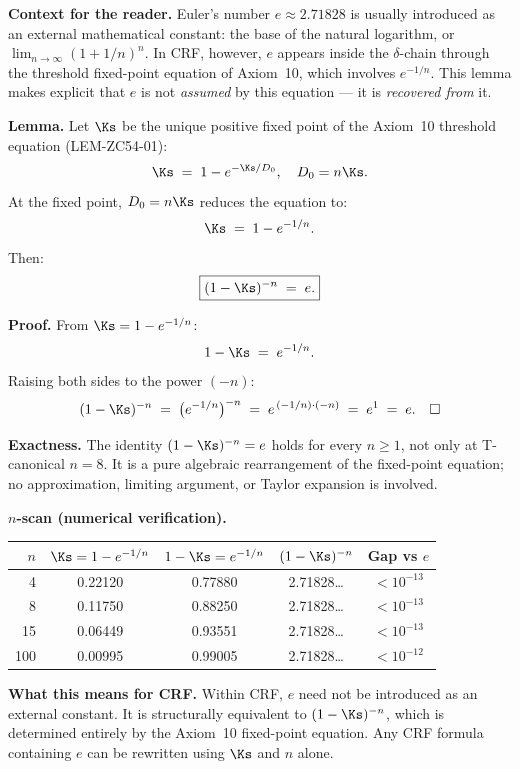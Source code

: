 \documentclass[12pt, a4paper]{article}
\begin{document}
\begin{formalbox}[title={LEM-ZC62-01: $e = (1-\Ks)^{-n}$
  --- Euler's Constant from the $\delta$-Chain Fixed Point
  ($R_0$, Exact at All $n$)}]

\textbf{Context for the reader.}
Euler's number $e \approx 2.71828$ is usually introduced as
an external mathematical constant: the base of the natural
logarithm, or $\lim_{n\to\infty}(1+1/n)^n$.
In CRF, however, $e$ appears inside the $\delta$-chain through
the threshold fixed-point equation of Axiom~10, which involves
$e^{-1/n}$.
This lemma makes explicit that $e$ is not \emph{assumed}
by this equation --- it is \emph{recovered from} it.

\medskip
\textbf{Lemma.}
Let $\Ks$ be the unique positive fixed point of the
Axiom~10 threshold equation (LEM-ZC54-01):
\[
  \Ks \;=\; 1 - e^{-\Ks/D_0}, \quad D_0 = n\Ks.
\]
At the fixed point, $D_0 = n\Ks$ reduces the equation to:
\[
  \Ks \;=\; 1 - e^{-1/n}.
\]
Then:
\begin{equation}
  \boxed{(1 - \Ks)^{-n} \;=\; e.}
  \label{eq:e-from-Ks}
\end{equation}

\textbf{Proof.}
From $\Ks = 1 - e^{-1/n}$:
\[
  1 - \Ks \;=\; e^{-1/n}.
\]
Raising both sides to the power $(-n)$:
\[
  (1-\Ks)^{-n}
  \;=\; \bigl(e^{-1/n}\bigr)^{-n}
  \;=\; e^{\,(-1/n)\cdot(-n)}
  \;=\; e^1
  \;=\; e.
  \quad\square
\]

\textbf{Exactness.}
The identity $(1-\Ks)^{-n} = e$ holds for every $n \geq 1$,
not only at T-canonical $n=8$.
It is a pure algebraic rearrangement of the fixed-point
equation; no approximation, limiting argument, or Taylor
expansion is involved.

\textbf{$n$-scan (numerical verification).}
\begin{center}
{\small\renewcommand{\arraystretch}{1.25}
\begin{tabular}{@{}rcccc@{}}
\toprule
$n$ & $\Ks = 1-e^{-1/n}$ & $1-\Ks = e^{-1/n}$ &
  $(1-\Ks)^{-n}$ & Gap vs $e$ \\
\midrule
4  & 0.22120 & 0.77880 & 2.71828\ldots & $<10^{-13}$ \\
8  & 0.11750 & 0.88250 & 2.71828\ldots & $<10^{-13}$ \\
15 & 0.06449 & 0.93551 & 2.71828\ldots & $<10^{-13}$ \\
100 & 0.00995 & 0.99005 & 2.71828\ldots & $<10^{-12}$ \\
\bottomrule
\end{tabular}
}
\end{center}

\textbf{What this means for CRF.}
Within CRF, $e$ need not be introduced as an external constant.
It is structurally equivalent to $(1-\Ks)^{-n}$, which is
determined entirely by the Axiom~10 fixed-point equation.
Any CRF formula containing $e$ can be rewritten using $\Ks$
and $n$ alone.
\end{formalbox}
\end{document}
